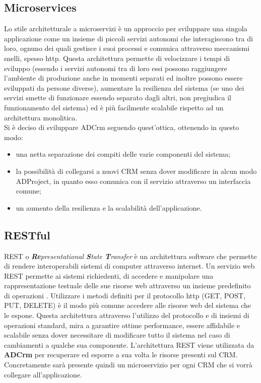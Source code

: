 \documentclass[12pt,a4paper,twoside,openany,english]{book}
\begin{document}
\subsection{Microservices}
Lo stile architetturale a microservizi è un approccio per sviluppare una singola applicazione come un insieme di piccoli servizi autonomi che interagiscono tra di loro, ognuno dei quali gestisce i suoi processi e comunica attraverso meccanismi snelli, spesso  \gls{http}.
Questa architettura permette di velocizzare i tempi di sviluppo (essendo i servizi autonomi tra di loro essi possono raggiungere l'ambiente di produzione anche in momenti separati ed inoltre possono essere sviluppati da persone diverse), aumentare la resilienza del sistema (se uno dei servizi smette di funzionare essendo separato dagli altri, non pregiudica il funzionamento del sistema) ed è più facilmente scalabile rispetto ad un architettura monolitica.\\
Si è deciso di sviluppare ADCrm seguendo quest'ottica, ottenendo in questo modo:
\begin{itemize}
	\itemsep-0.5em
	\item una netta separazione dei compiti delle varie componenti del sistema;
	\item la possibilità di collegarsi a nuovi \gls{CRM} senza dover modificare in alcun modo ADProject, in quanto esso comunica con il servizio attraverso un interfaccia comune;
	\item un aumento  della resilienza e la scalabilità dell'applicazione.
\end{itemize}


\subsection{RESTful}\label{rest}
REST o \textit{\textbf{Re}presentational \textbf{S}tate \textbf{T}ransfer} è un architettura software che permette di rendere interoperabili sistemi di computer attraverso internet. 
Un servizio web REST permette ai sistemi richiedenti, di accedere e manipolare una rappresentazione testuale delle sue risorse web attraverso un insieme predefinito di operazioni .
Utilizzare i metodi definiti per il protocollo \gls{http} (GET, POST, PUT, DELETE) è il modo più comune accedere alle risorse web del sistema che le espone.
Questa architettura attraverso l'utilizzo del protocollo  e di insiemi di operazioni standard, mira a garantire ottime performance, essere affidabile e scalabile senza dover necessitare di modificare tutto il sistema nel caso di cambiamenti a qualche sua componente.
L'architettura REST viene utilizzata da \textbf{ADCrm\textbf{}} per recuperare ed esporre a sua volta le risorse presenti sul \gls{CRM}.
Concretamente sarà presente quindi un microservizio per ogni \gls{CRM} che si vorrà collegare all'applicazione.
\end{document}
